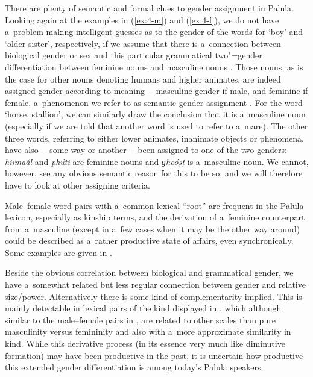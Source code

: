 There are plenty of semantic and formal clues to gender assignment in Palula. Looking again at the examples in (\ref{ex:4-m}) and (\ref{ex:4-f}), we do not have a~problem making intelligent guesses as to the gender of the words for `boy' and `older sister', respectively, if we assume that there is a~connection between biological gender or sex and this particular grammatical two"=gender differentiation between feminine nouns and masculine nouns \citep[102]{dahl2000}. Those nouns, as is the case for other nouns denoting humans and higher animates, are indeed assigned gender according to meaning~-- masculine gender if male, and feminine if female, a~phenomenon we refer to as semantic gender assignment \citep[7--32]{corbett1991}. For the word `horse, stallion', we can similarly draw the conclusion that it is a~masculine noun (especially if we are told that another word is used to refer to a~mare). The other three words, referring to either lower animates, inanimate objects or phenomena, have also~-- some way or another~-- been assigned to one of the two genders: \textit{hiimaál} and \textit{phúti} are feminine nouns and \textit{ɡhoóṣṭ} is a~masculine noun. We cannot, however, see any obvious semantic reason for this to be so, and we will therefore have to look at other assigning criteria.


Male--female word pairs with a~common lexical ``root'' are frequent in the Palula lexicon, especially as kinship terms, and the derivation of a~feminine counterpart from a~masculine (except in a~few cases when it may be the other way around) could be described as a~rather productive state of affairs, even synchronically. Some examples are given in .


Beside the obvious correlation between biological and grammatical gender, we have a~somewhat related but less regular connection between gender and relative size/power. Alternatively there is some kind of complementarity implied. This is mainly detectable in lexical pairs of the kind displayed in , which although similar to the male--female pairs in , are related to other scales than pure masculinity versus femininity and also with a~more approximate similarity in kind. While this derivative process (in its essence very much like diminutive formation) may have been productive in the past, it is uncertain how productive this extended gender differentiation is among today's Palula speakers.



